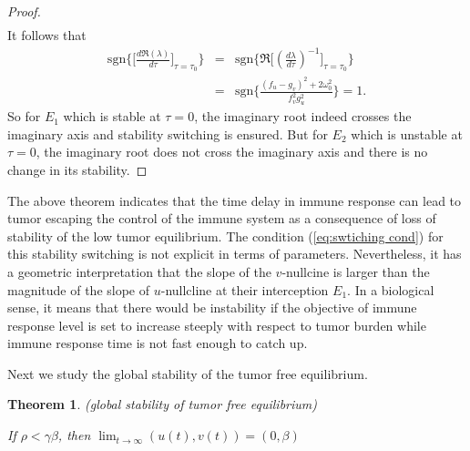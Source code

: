 \documentclass{aims}
\newtheorem{theorem}{Theorem}[section]
\theoremstyle{definition}
\begin{document}
\begin{proof}
\begin{eqnarray*}
\end{eqnarray*}
 It follows that 
\begin{eqnarray*}
\text{sgn}\bigg\{\bigg[\frac{d\Re(\lambda)}{d\tau}\bigg]_{\tau=\tau_{0}}\bigg\} & = & \text{sgn}\bigg\{\Re\bigg[(\frac{d\lambda}{d\tau})^{-1}\bigg]_{\tau=\tau_{0}}\bigg\}\\
 & = & \text{sgn}\bigg\{\frac{(f_{u}-g_{v})^{2}+2\omega_{0}^{2}}{f_{v}^{2}g_{u}^{2}}\bigg\}=1.
\end{eqnarray*}
So for $E_1$ which is stable at $\tau=0$, the imaginary root indeed crosses the imaginary axis and stability switching is ensured. But for $E_2$ which is unstable at $\tau=0$, the imaginary root does not cross the imaginary axis and there is no change in its stability.  
\end{proof}

The above theorem indicates that the time delay in immune response can lead to tumor escaping the control of the immune system as a consequence of loss of stability of the low tumor equilibrium.  The condition (\ref{eq:swtiching cond}) for this stability switching is not explicit in terms of parameters. Nevertheless, it has a geometric interpretation that the slope of the $v$-nullcine is larger than the magnitude of the slope of $u$-nullcline at their interception $E_{1}$. In a biological sense, it means that there would be instability if the objective of immune response level is set to increase steeply with respect to tumor burden while immune response time is not fast enough to catch up.

Next we study the global stability of the tumor free equilibrium. 
\begin{theorem}
\textup{(global stability of tumor free equilibrium)} 

If $\rho<\gamma\beta$, then $\lim_{t\to\infty}(u(t),v(t))=(0,\beta)$ 
\end{theorem}
\end{document}
